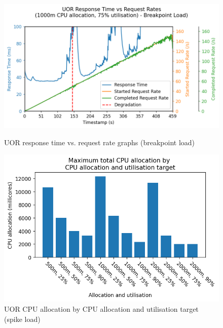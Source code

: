 \begin{figure}[h]
    \centering
    \begin{minipage}{.45\textwidth}
        \centering
        \includegraphics[width=\linewidth]{figures/uor-rau-i7-breakpoint-rt-graph.png}
        \caption{UOR response time vs. request rate graphs (breakpoint load)}
        \label{figure:uor-resource-allocation-rt-graph-i7-breakpoint}
    \end{minipage}%
    \hspace{0.05\textwidth} %
    \begin{minipage}{.45\textwidth}
        \centering
        \includegraphics[width=\linewidth]{figures/uor-rau-breakpoint-cpu-allocation.png}
        \caption{UOR CPU allocation by CPU allocation and utilisation target (spike load)}
        \label{figure:uor-resource-allocation-breakpoint-cpu-allocation}
    \end{minipage}
\end{figure}

